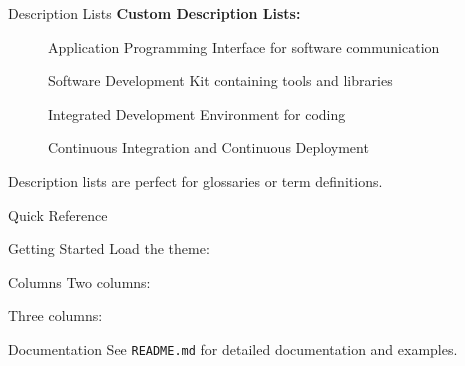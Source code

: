\documentclass[10pt,aspectratio=1610]{beamer}
\begin{document}
\begin{frame}{Description Lists}
    \textbf{Custom Description Lists:}
    
    \begin{description}
        \item[] Application Programming Interface for software communication
        \item[] Software Development Kit containing tools and libraries
        \item[] Integrated Development Environment for coding
        \item[] Continuous Integration and Continuous Deployment
    \end{description}
    
    \vspace{1em}
    
    \begin{lightbox}
        Description lists are perfect for glossaries or term definitions.
    \end{lightbox}
\end{frame}

\begin{frame}{Quick Reference}
    \begin{tagblock}{Getting Started}
        Load the theme: 
    \end{tagblock}
    
    \vspace{0.3em}
    
    \begin{tagblock}{Columns}
        Two columns: 
        
        Three columns: 
    \end{tagblock}
    
    \vspace{0.3em}
    
    \begin{tagblock}{Documentation}
        See \texttt{README.md} for detailed documentation and examples.
    \end{tagblock}
\end{frame}
\end{document}
